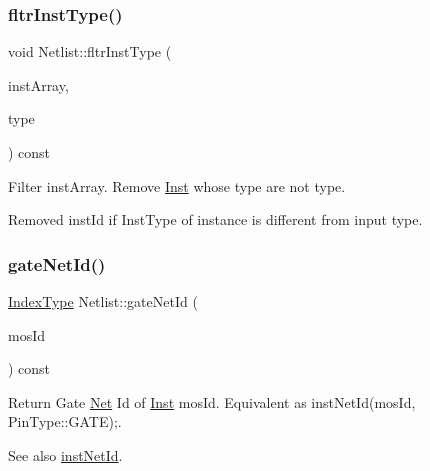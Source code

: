 \subsubsection{\texorpdfstring{fltr\+Inst\+Type()}{fltrInstType()}}
{\footnotesize\ttfamily void Netlist\+::fltr\+Inst\+Type (\begin{DoxyParamCaption}\item[{std\+::vector$<$ \hyperlink{type_8h_a581e8093e28e7362f2b6937296190676}{Index\+Type} $>$ \&}]{inst\+Array,  }\item[{\hyperlink{type_8h_a53644c687d6bc203d9d3d3ee70075f61}{Inst\+Type}}]{type }\end{DoxyParamCaption}) const}



Filter inst\+Array. Remove \hyperlink{classInst}{Inst} whose type are not type. 

Removed inst\+Id if Inst\+Type of instance is different from input type. \mbox{\label{classNetlist_a6c248fed42772e11d054d8dccb720005}} 
\subsubsection{\texorpdfstring{gate\+Net\+Id()}{gateNetId()}}
{\footnotesize\ttfamily \hyperlink{type_8h_a581e8093e28e7362f2b6937296190676}{Index\+Type} Netlist\+::gate\+Net\+Id (\begin{DoxyParamCaption}\item[{\hyperlink{type_8h_a581e8093e28e7362f2b6937296190676}{Index\+Type}}]{mos\+Id }\end{DoxyParamCaption}) const\hspace{0.3cm}{\ttfamily [inline]}}



Return Gate \hyperlink{classNet}{Net} Id of \hyperlink{classInst}{Inst} mos\+Id. Equivalent as inst\+Net\+Id(mos\+Id, Pin\+Type\+::\+G\+A\+T\+E);. 

\begin{DoxySeeAlso}{See also}
\hyperlink{classNetlist_af7ac6daa5f0f66a60c71b69a1d8fd670}{inst\+Net\+Id}. 
\end{DoxySeeAlso}
\mbox{\label{classNetlist_a3d210cdd4e0db6c7d4c0cdb5c7da5e4d}} 

